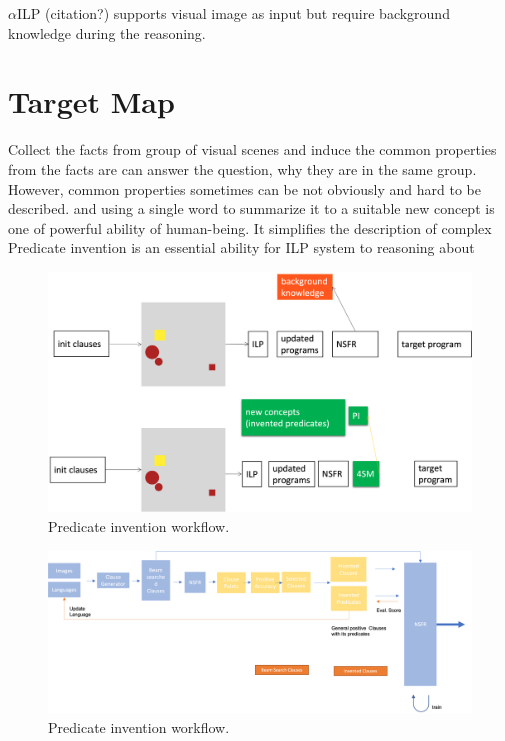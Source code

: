 \documentclass[
]{ceurart}
\begin{document}
$ \alpha $ILP (citation?) supports visual image as input but require background knowledge during the reasoning.


 
 

\section{Target Map}

Collect the facts from group of visual scenes and induce the common properties from the facts are 
can answer the question, why they are in the same group. However, common properties sometimes can be not obviously and hard to be described.
and using a single word  to summarize it to a suitable new concept is one of powerful ability of human-being. It simplifies the description of complex 
Predicate invention is an essential ability for ILP system to reasoning about 

\begin{figure}[h]
	\centering
	\begin{minipage}{\textwidth}
		\includegraphics[width=\linewidth]{img/intro_compare.png} 
		\caption{Predicate invention workflow.}
		\label{fig:Pipeline comparison between neural symbolic-ILP system without PI module and with PI module.}
	\end{minipage}
\end{figure}


\begin{figure}[h]
	\centering
	\begin{minipage}{\textwidth}
		\includegraphics[width=\linewidth]{img/pi_structure.png} 
		\caption{Predicate invention workflow.}
		\label{fig:pi-structure}
	\end{minipage}
\end{figure}
\end{document}
